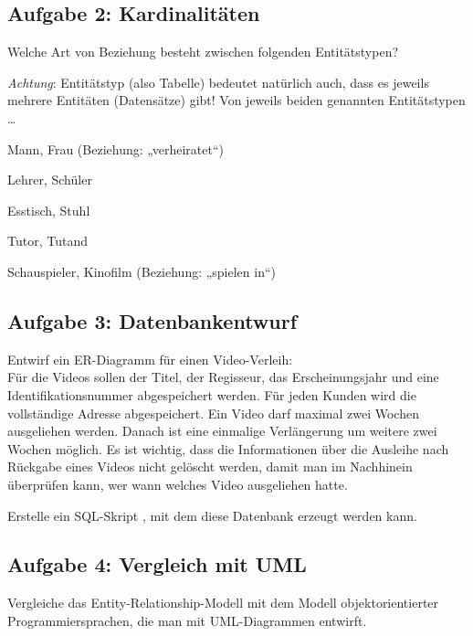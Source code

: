 \subsection{Aufgabe 2: Kardinalitäten}

Welche Art von Beziehung besteht zwischen folgenden Entitätstypen? 

\emph{Achtung}: Entitätstyp (also Tabelle) bedeutet natürlich auch, dass es
jeweils mehrere Entitäten (Datensätze) gibt! Von jeweils beiden genannten Entitätstypen
\ldots

\begin{compactenum}[a)]
\item Mann, Frau (Beziehung: „verheiratet“)
\item Lehrer, Schüler
\item Esstisch, Stuhl
\item Tutor, Tutand
\item Schauspieler, Kinofilm (Beziehung: „spielen in“)
\end{compactenum}


\subsection{Aufgabe 3: Datenbankentwurf}

\begin{compactenum}[a)] 
\item Entwirf ein ER-Diagramm für einen Video-Verleih:\\
Für die Videos sollen der Titel, der Regisseur, das Erscheinungsjahr und eine
Identifikationsnummer abgespeichert werden. Für jeden Kunden wird die
vollständige Adresse abgespeichert. Ein Video darf maximal zwei Wochen
ausgeliehen werden. Danach ist eine einmalige Verlängerung um weitere zwei
Wochen möglich. Es ist wichtig, dass die Informationen über die Ausleihe nach
Rückgabe eines Videos nicht gelöscht werden, damit man im Nachhinein überprüfen
kann, wer wann welches Video ausgeliehen hatte.
\item Erstelle ein SQL-Skript , mit dem diese
Datenbank erzeugt werden kann.
\end{compactenum}

\pagebreak
 
\subsection{Aufgabe 4: Vergleich mit UML}

Vergleiche das Entity-Relationship-Modell mit dem Modell objektorientierter
Programmiersprachen, die man mit UML-Diagrammen entwirft.


